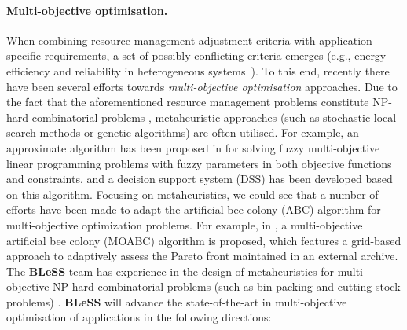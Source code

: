 \documentclass[a4paper,11pt]{article}
\newcommand{\project}[1]{\textbf{#1}\xspace}
\newcommand{\BLESS}{\project{BLeSS}}
\newcommand{\TheProject}{\BLESS}
\begin{document}
\paragraph{Multi-objective optimisation.} When combining resource-management adjustment criteria with application-specific requirements, a set of possibly conflicting criteria emerges (e.g., energy efficiency and reliability in heterogeneous 
systems~\cite{wang_optimizing_2011,zhang_joint_2016}). To this end, recently there have been several efforts towards \emph{multi-objective optimisation} approaches. Due to the fact that the aforementioned resource management problems constitute NP-hard 
combinatorial problems \cite{garey_computers_1979}, metaheuristic approaches 
(such as stochastic-local-search methods \cite{Hoos05} or genetic algorithms) 
are often utilised. For example, an approximate algorithm has been proposed in \cite{wu_new_2006} for solving fuzzy multi-objective linear programming problems with fuzzy parameters in both objective functions and constraints, and a decision support system (DSS) has been developed based on this algorithm. Focusing on metaheuristics, we could see that a number of efforts have been made to adapt the artificial bee colony (ABC) algorithm for multi-objective optimization problems. For example, in \cite{akbari_multi-objective_2012}, a multi-objective artificial bee colony (MOABC) algorithm is proposed, which features a grid-based approach to adaptively assess the Pareto front maintained in an external archive. The \TheProject team has experience in the design of metaheuristics for multi-objective NP-hard combinatorial problems (such as bin-packing and cutting-stock problems) \cite{chasparis_evolutionary_2017}. 
% 
\TheProject will advance the state-of-the-art in multi-objective optimisation of applications in the following directions:
\end{document}
